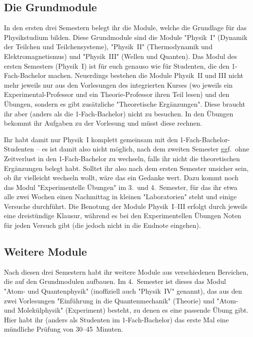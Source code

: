 \begin{multicols*}{2}
\subsection{Die Grundmodule}
In den ersten drei Semestern belegt ihr die Module, welche die Grundlage für das Physikstudium bilden.
Diese Grundmodule sind die Module "Physik~I" (Dynamik der Teilchen und Teilchensysteme), "Physik~II" (Thermodynamik und Elektromagnetismus) und "Physik~III" (Wellen und Quanten).
Das Modul des ersten Semesters (Physik~I) ist für euch genauso wie für Studenten, die den 1-Fach-Bachelor machen.
Neuerdings bestehen die Module Physik~II und III nicht mehr jeweils nur aus den Vorlesungen des integrierten Kurses (wo jeweils ein Experimental-Professor und ein Theorie-Professor ihren Teil lesen) und den Übungen, sondern es gibt zusätzliche "Theoretische Ergänzungen".
Diese braucht ihr aber (anders als die 1-Fach-Bachelor) nicht zu besuchen.
In den Übungen bekommt ihr Aufgaben zu der Vorlesung und müsst diese rechnen.

Ihr habt damit nur Physik~I komplett gemeinsam mit den 1-Fach-Bachelor-Studenten -- es ist damit also nicht möglich, nach dem zweiten Semester ggf.\ ohne Zeitverlust in den 1-Fach-Bachelor zu wechseln, falls ihr nicht die theoretischen Ergänzungen belegt habt.
Solltet ihr also nach dem ersten Semester unsicher sein, ob ihr vielleicht wechseln wollt, wäre das ein Gedanke wert.
Dazu kommt noch das Modul "Experimentelle Übungen" im 3.\ und 4.~Semester, für das ihr etwa alle zwei Wochen einen Nachmittag in kleinen "Laboratorien" steht und einige Versuche durchführt.
Die Benotung der Module Physik~I--III erfolgt durch jeweils eine dreistündige Klausur, während es bei den Experimentellen Übungen Noten für jeden Versuch gibt (die jedoch nicht in die Endnote eingehen).

\subsection{Weitere Module}
Nach diesen drei Semestern habt ihr weitere Module aus verschiedenen Bereichen, die auf den Grundmodulen aufbauen.
Im 4.~Semester ist dieses das Modul "Atom- und Quantenphysik" (inoffiziell auch "Physik~IV" genannt), das aus den zwei Vorlesungen "Einführung in die Quantenmechanik" (Theorie) und "Atom- und Molekülphysik" (Experiment) besteht, zu denen es eine passende Übung gibt.
Hier habt ihr (anders als Studenten im 1-Fach-Bachelor) das erste Mal eine mündliche Prüfung von 30--45~Minuten.


\end{multicols*}
